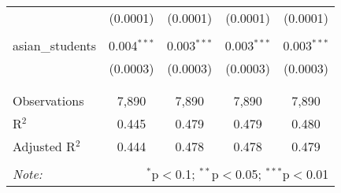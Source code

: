\begin{table}[!htbp]
\begin{tabular}{@{\extracolsep{-2pt}}lcccc}
  & (0.0001) & (0.0001) & (0.0001) & (0.0001) \\ 
  & & & & \\ 
 asian\_students & 0.004$^{***}$ & 0.003$^{***}$ & 0.003$^{***}$ & 0.003$^{***}$ \\ 
  & (0.0003) & (0.0003) & (0.0003) & (0.0003) \\ 
  & & & & \\ 
\hline \\[-1.8ex] 
Observations & 7,890 & 7,890 & 7,890 & 7,890 \\ 
R$^{2}$ & 0.445 & 0.479 & 0.479 & 0.480 \\ 
Adjusted R$^{2}$ & 0.444 & 0.478 & 0.478 & 0.479 \\ 
\hline 
\hline \\[-1.8ex] 
\textit{Note:}  & \multicolumn{4}{r}{$^{*}$p$<$0.1; $^{**}$p$<$0.05; $^{***}$p$<$0.01} \\ 
\end{tabular} 
\end{table} 
